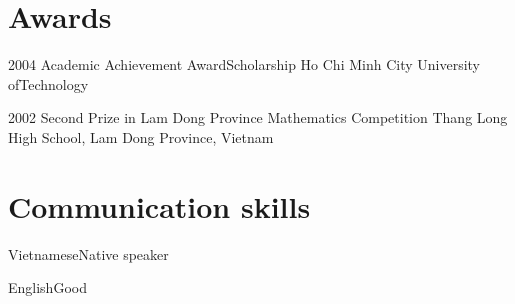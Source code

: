 \documentclass{tccv}
\begin{document}
\section{Awards}

\begin{yearlist}

\item{2004}
    {Academic Achievement Award\newline Scholarship}
    {Ho Chi Minh City University of\newline Technology}

\item{2002}
    {Second Prize in Lam Dong Province Mathematics Competition}
    {Thang Long High School, Lam Dong Province, Vietnam}

\end{yearlist}

\section{Communication skills}

\begin{factlist}
\item{Vietnamese}{Native speaker}
\item{English}{Good}
\end{factlist}
\end{document}
